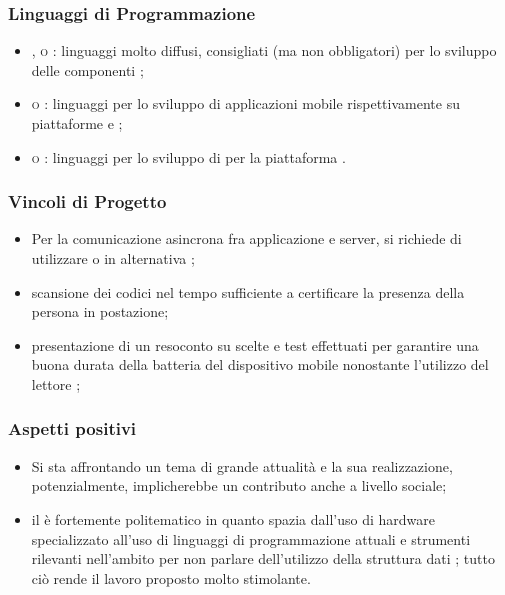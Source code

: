 \documentclass[]{article}
\begin{document}
			\subsubsection{Linguaggi di Programmazione}
			\begin{itemize}
				\item \textsc{,  o :} linguaggi molto diffusi, consigliati (ma non obbligatori) per lo sviluppo delle componenti ;
				\item \textsc{ o :} linguaggi per lo sviluppo di applicazioni mobile rispettivamente su piattaforme  e ;
				\item \textsc{ o :} linguaggi per lo sviluppo di  per la piattaforma .
			\end{itemize}

			\subsubsection{Vincoli di Progetto}
			\begin{itemize}
				\item Per la comunicazione asincrona fra applicazione e server, si richiede di utilizzare  o in alternativa ;
				\item scansione dei codici nel tempo sufficiente a certificare la presenza della persona in postazione;
				\item presentazione di un resoconto su scelte e test effettuati per garantire una buona durata della batteria del dispositivo mobile nonostante l'utilizzo del lettore ;
			\end{itemize}

			\subsubsection{Aspetti positivi}
			\begin{itemize}
				\item Si sta affrontando un tema di grande attualità e la sua realizzazione, potenzialmente, implicherebbe un contributo anche a livello sociale;
				\item il  è fortemente politematico in quanto spazia dall'uso di hardware specializzato all'uso di linguaggi di programmazione attuali e strumenti rilevanti nell'ambito  per non parlare dell'utilizzo della struttura dati ; tutto ciò rende il lavoro proposto molto stimolante.
			\end{itemize}
\end{document}

